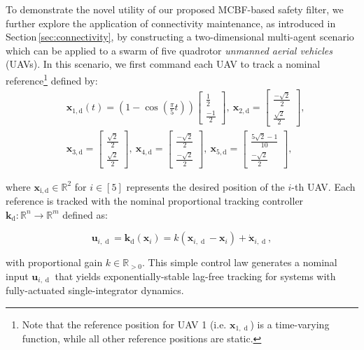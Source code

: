 \documentclass[10pt,twocolumn,twoside]{IEEEtran}
\newcommand{\realpos}{\mathbb{R}_{> 0}}
\newcommand{\until}[1]{[#1]}
\newcommand{\R}{\mathbb{R}}
\theoremstyle{definition}
\newcommand{\bk}{\mathbf{k}}
\newcommand{\bu}{\mathbf{u}}
\newcommand{\bx}{\mathbf{x}}
\newcommand{\des}{{\operatorname{d}}}
\begin{document}
To demonstrate the novel utility of our proposed MCBF-based safety filter, we further explore the application of connectivity maintenance, as introduced in Section\,\ref{sec:connectivity}, by constructing a two-dimensional multi-agent scenario which can be applied to a swarm of five quadrotor \textit{unmanned aerial vehicles} (UAVs). In this scenario, we first command each UAV to track a nominal reference\footnote{Note that the reference position for UAV 1 (i.e. $\bx_{1,\des}$) is a time-varying function, while all other reference positions are static.} defined by:
\begin{align*}
   &\bx_{1,\mathrm{d}}(t) = \left(1 - \cos\left(\frac{\pi}{5}t\right)\right)
    \begin{bmatrix}
        \frac{1}{2}\\\frac{-1}{2}
    \end{bmatrix},~\bx_{2,\mathrm{d}} = 
    \begin{bmatrix}
        \frac{-\sqrt2}{2}\\\frac{\sqrt2}{2}
    \end{bmatrix},\\
    &\bx_{3,\mathrm{d}} = 
    \begin{bmatrix}
        \frac{\sqrt2}{2}\\\frac{\sqrt2}{2}
    \end{bmatrix},~\bx_{4,\mathrm{d}} = 
    \begin{bmatrix}
        \frac{-\sqrt2}{2}\\\frac{-\sqrt2}{2}
    \end{bmatrix},~ 
    \bx_{5,\mathrm{d}} = 
    \begin{bmatrix}
        \frac{5\sqrt2-1}{10}\\\frac{-\sqrt2}{2}
    \end{bmatrix},
\end{align*}

\noindent where $\bx_\mathrm{i,\mathrm{d}}\in\R^2$ for $i\in\until{5}$ represents the desired position of the $i$-th UAV. Each reference is tracked with the nominal proportional tracking controller $\bk_{\des}:\R^n\rightarrow\R^m$ defined as:

\begin{equation}
\label{eq:p-control}
\bu_{i,\des}=\bk_{\des}(\bx_i) = k(\bx_{i,\des} - \bx_i) + \dot{\bx}_{i,\des},
\end{equation}

\noindent with proportional gain $k\in\realpos$. This simple control law generates a nominal input $\bu_{i,\des}$ that yields exponentially-stable lag-free tracking for systems with fully-actuated single-integrator dynamics. 
\end{document}
